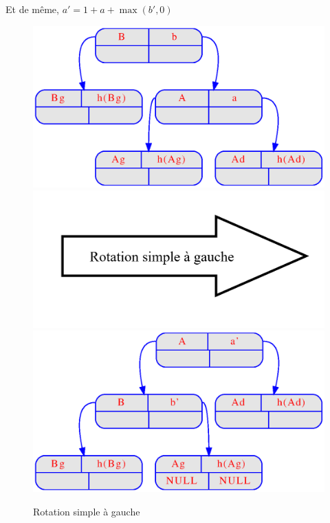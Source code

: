 \documentclass{article} %
\begin{document}
Et de même, \( a' = 1 + a + \max(b', 0) \)

\begin{figure}[!h]
\begin{center}
\includegraphics[scale=0.35]{Img_prog1/LeftRotate1.eps}
\includegraphics[scale=0.20]{Img_prog1/FlecheLeftrotate.png}
\includegraphics[scale=0.35]{Img_prog1/LeftRotate2.eps}
\end{center}

\caption{Rotation simple à gauche}
\label{LeftRot}
\end{figure}
\end{document}
